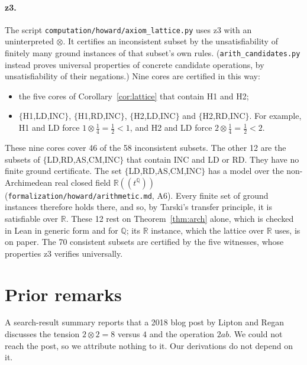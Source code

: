 \documentclass[11pt]{article}
\theoremstyle{remark}
\begin{document}
\paragraph{z3.} The script \texttt{computation/howard/axiom\_lattice.py} uses z3 \cite{z3} with an uninterpreted $\otimes$. It certifies an inconsistent subset by the unsatisfiability of finitely many ground instances of that subset's own rules. (\texttt{arith\_candidates.py} instead proves universal properties of concrete candidate operations, by unsatisfiability of their negations.) Nine cores are certified in this way:
\begin{itemize}
\item the five cores of Corollary~\ref{cor:lattice} that contain H1 and H2;
\item $\{$H1,LD,INC$\}$, $\{$H1,RD,INC$\}$, $\{$H2,LD,INC$\}$ and $\{$H2,RD,INC$\}$. For example, H1 and LD force $1\otimes\tfrac14=\tfrac12<1$, and H2 and LD force $2\otimes\tfrac14=\tfrac12<2$.
\end{itemize}
These nine cores cover 46 of the 58 inconsistent subsets. The other 12 are the subsets of $\{$LD,RD,AS,CM,INC$\}$ that contain INC and LD or RD. They have no finite ground certificate. The set $\{$LD,RD,AS,CM,INC$\}$ has a model over the non-Archimedean real closed field $\mathbb R((t^{\mathbb Q}))$ (\texttt{formalization/howard/arithmetic.md}, A6). Every finite set of ground instances therefore holds there, and so, by Tarski's transfer principle, it is satisfiable over $\mathbb R$. These 12 rest on Theorem~\ref{thm:arch} alone, which is checked in Lean in generic form and for $\mathbb Q$; its $\mathbb R$ instance, which the lattice over $\mathbb R$ uses, is on paper. The 70 consistent subsets are certified by the five witnesses, whose properties z3 verifies universally.

\section*{Prior remarks}
A search-result summary reports that a 2018 blog post by Lipton and Regan \cite{LR18} discusses the tension $2\otimes2=8$ versus $4$ and the operation $2ab$. We could not reach the post, so we attribute nothing to it. Our derivations do not depend on it.
\end{document}
